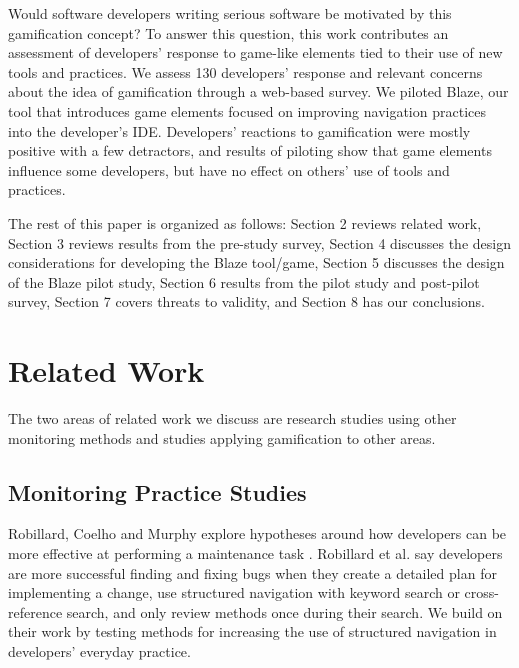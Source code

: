 \documentclass{sig-alternate}
\begin{document}
Would software developers writing serious software be motivated by this gamification concept? To answer this question, this work contributes an assessment of developers' response to game-like elements tied to their use of new tools and practices.  We assess 130 developers' response and relevant concerns about the idea of gamification through a web-based survey.  We piloted Blaze, our tool that introduces game elements focused on improving navigation practices into the developer's IDE.  Developers' reactions to gamification were mostly positive with a few detractors, and results of piloting show that game elements influence some developers, but have no effect on others' use of tools and practices.

The rest of this paper is organized as follows:  Section 2 reviews related work, Section 3 reviews results from the pre-study survey, Section 4 discusses the design considerations for developing the Blaze tool/game, Section 5 discusses the design of the Blaze pilot study, Section 6 results from the pilot study and post-pilot survey, Section 7 covers threats to validity, and Section 8 has our conclusions.

\section{Related Work}

The two areas of related work we discuss are research studies using other monitoring methods and studies applying gamification to other areas.

\subsection{Monitoring Practice Studies}

Robillard, Coelho and Murphy explore hypotheses around how developers can be more effective at performing a maintenance task \cite{wbsnipes:Robillard2004How}.  Robillard et al. say developers are more successful finding and fixing bugs when they create a detailed plan for implementing a change, use structured navigation with keyword search or cross-reference search, and only review methods once during their search.  We build on their work by testing methods for increasing the use of structured navigation in developers' everyday practice.
\end{document}
